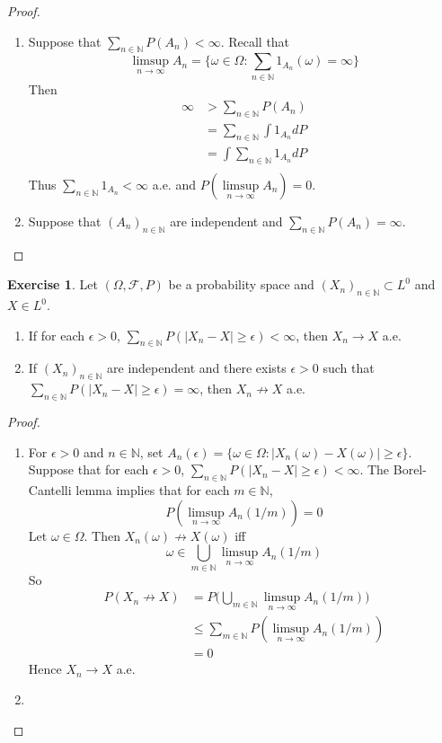 \documentclass[12pt]{amsart}
\theoremstyle{definition}
\newtheorem{ex}[definition]{Exercise}
\newcommand{\ep}{\epsilon}
\newcommand{\om}{\omega}
\newcommand{\Om}{\Omega}
\newcommand{\N}{\mathbb{N}}
\newcommand{\MF}{\mathcal{F}}
\newcommand{\limpn}{\limsup \limits_{n \rightarrow \infty}}
\begin{document}
	\begin{proof}\
		\begin{enumerate}
			\item Suppose that $\sum\limits_{n \in \N}P(A_n) < \infty$. Recall that $$\limsup\limits_{n \rightarrow \infty}A_n = \bigg \{\om \in \Om: \sum\limits_{n \in \N}1_{A_n}(\om) = \infty \bigg \}$$ Then \begin{align*}
				\infty 
				&> \sum_{n \in \N}P(A_n) \\
				&= \sum_{n \in \N} \int 1_{A_n}dP \\
				&= \int \sum_{n \in \N} 1_{A_n}dP \\
			\end{align*}
			Thus $\sum \limits_{n \in \N} 1_{A_n} < \infty$ a.e. and $P(\limpn A_n) = 0$.
			\item Suppose that $(A_n)_{n \in \N}$ are independent and $\sum\limits_{n \in \N} P(A_n) = \infty$.
		\end{enumerate}
	\end{proof}
	
	\begin{ex}
		Let $(\Om, \MF, P)$ be a probability space and $(X_n)_{n \in \N} \subset L^0$ and $X \in L^0$. 
		\begin{enumerate}
			\item If for each $\ep >0 $, $\sum\limits_{n \in \N} P(|X_n -X| \geq \ep) < \infty$, then $X_n \rightarrow X$ a.e.
			\item If $(X_n)_{n \in \N}$ are independent and there exists $\ep >0$ such that $\sum\limits_{n \in \N} P(|X_n -X| \geq \ep) = \infty$, then $X_n \not \rightarrow X$ a.e.
		\end{enumerate}
	\end{ex}
	
	\begin{proof}\
		\begin{enumerate}
			\item For $\ep>0$ and $n \in \N$, set $A_n(\ep) = \{\om \in \Om: |X_n(\om) - X(\om)| \geq \ep\}$. Suppose that for each $\ep >0 $, $\sum\limits_{n \in \N} P(|X_n - X| \geq \ep) < \infty$.  The Borel-Cantelli lemma implies that for each $m \in \N$,  $$P(\limpn A_n(1/m)) = 0$$
			 Let $\om \in \Om$. Then $X_n(\om) \not \rightarrow X(\om)$ iff $$\om \in \bigcup_{m \in \N} \limpn A_n(1/m)$$ 
		So 
		\begin{align*}
		P(X_n \not \rightarrow X)
		&= P\bigg( \bigcup_{m \in \N} \limpn A_n(1/m) \bigg) \\
		&\leq \sum_{m \in \N}P(\limpn A_n(1/m)) \\
		&= 0
\end{align*}		 
	Hence $X_n \rightarrow X$ a.e.
	\item 
		\end{enumerate}
	\end{proof}
	
\end{document}
